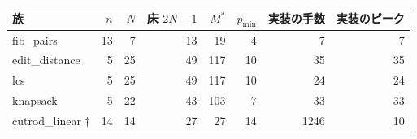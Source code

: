 \begin{tabular}{l r r r r r r r}
\toprule
族 & $n$ & $N$ & 床 $2N-1$ & $M^{*}$ & $p_{\min}$ & 実装の手数 & 実装のピーク \\
\midrule
fib\_pairs & 13 & 7 & 13 & 19 & 4 & 7 & 7 \\
edit\_distance & 5 & 25 & 49 & 117 & 10 & 35 & 35 \\
lcs & 5 & 25 & 49 & 117 & 10 & 24 & 24 \\
knapsack & 5 & 22 & 43 & 103 & 7 & 33 & 33 \\
cutrod\_linear $\dagger$ & 14 & 14 & 27 & 27 & 14 & 1246 & 10 \\
\bottomrule
\end{tabular}

